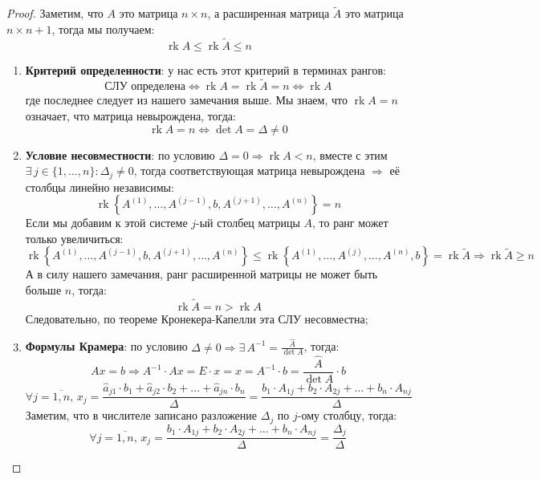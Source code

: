 \documentclass[12pt]{article}
\theoremstyle{definition}
\DeclareMathOperator{\rk}{\text{rk}}
\newcommand{\wte}[1]{\widetilde{#1}}
\newcommand{\wht}[1]{\widehat{#1}}
\begin{document}
\begin{proof}
	Заметим, что $A$ это матрица $n\times n$, а расширенная матрица $\wte{A}$ это матрица $n \times n+1$, тогда мы получаем:
	$$
		\rk{A} \leq \rk{\wte{A}}\leq n
	$$
	\begin{enumerate}[label=\arabic*)]
		\item \textbf{Критерий определенности}: у нас есть этот критерий в терминах рангов:
		$$
			\text{СЛУ определена} \Leftrightarrow \rk{A} = \rk{\wte{A}} = n \Leftrightarrow \rk{A}
		$$
		где последнее следует из нашего замечания выше. Мы знаем, что $\rk{A} = n$ означает, что матрица невырождена, тогда:
		$$
			\rk{A} = n \Leftrightarrow \det{A} = \Delta \neq 0
		$$
		\item \textbf{Условие несовместности}: по условию $\Delta = 0 \Rightarrow \rk{A} < n$, вместе с этим $\exists \, j \in \{1,\dotsc,n\}\colon \Delta_j \neq 0$, тогда соответствующая матрица невырождена $\Rightarrow$ её столбцы линейно независимы:
		$$
			\rk{\left\{A^{(1)}, \dotsc, A^{(j-1)}, b, A^{(j+1)}, \dotsc, A^{(n)}\right\}} = n 
		$$
		Если мы добавим к этой системе $j$-ый столбец матрицы $A$, то ранг может только увеличиться:
 		$$
			\rk{\left\{A^{(1)}, \dotsc, A^{(j-1)}, b, A^{(j+1)}, \dotsc, A^{(n)}\right\}} \leq \rk{\left\{A^{(1)}, \dotsc, A^{(j)}, \dotsc, A^{(n)}, b\right\}} = \rk{\wte{A}} \Rightarrow \rk{\wte{A}} \geq n
		$$
		А в силу нашего замечания, ранг расширенной матрицы не может быть больше $n$, тогда: 
		$$
			\rk{\wte{A}} =n > \rk{A}
		$$ 
		Следовательно, по теореме Кронекера-Капелли эта СЛУ несовместна;
		\item \textbf{Формулы Крамера}: по условию $\Delta \neq 0 \Rightarrow \exists \, A^{-1} = \tfrac{\wht{A}}{\det{A}}$, тогда:
		$$
			Ax = b \Rightarrow A^{-1}{\cdot}Ax = E{\cdot}x = x = A^{-1}{\cdot}b = \dfrac{\wht{A}}{\det{A}}{\cdot}b
		$$
		$$
			\forall j = \overline{1,n}, \, x_j = \dfrac{\wht{a}_{j1}{\cdot}b_1 + \wht{a}_{j2}{\cdot}b_2 + \dotsc + \wht{a}_{jn}{\cdot}b_n}{\Delta} = \dfrac{b_1{\cdot}A_{1j} + b_2{\cdot}A_{2j} + \dotsc + b_n{\cdot}A_{nj}}{\Delta}
		$$
		Заметим, что в числителе записано разложение $\Delta_j$ по $j$-ому столбцу, тогда:
		$$
			\forall j = \overline{1,n}, \, x_j =  \dfrac{b_1{\cdot}A_{1j} + b_2{\cdot}A_{2j} + \dotsc + b_n{\cdot}A_{nj}}{\Delta} = \dfrac{\Delta_j}{\Delta}
		$$
	\end{enumerate}
\end{proof}
\end{document}
